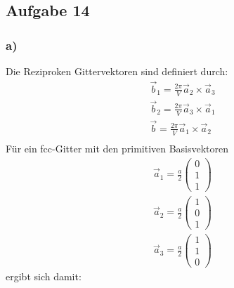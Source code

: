 \subsection*{Aufgabe 14}
\subsubsection*{a)}
Die Reziproken Gittervektoren sind definiert durch:
\begin{align*}
\vec{b}_1 = \frac{2\pi}{V} \vec{a}_2\times\vec{a}_3\\
\vec{b}_2 = \frac{2\pi}{V} \vec{a}_3\times\vec{a}_1\\
\vec{b} = \frac{2\pi}{V} \vec{a}_1\times\vec{a}_2\\
\end{align*}
Für ein fcc-Gitter mit den primitiven Basisvektoren 
\begin{align*}
\vec{a}_1=\frac{a}{2}\begin{pmatrix}0\\1\\1\end{pmatrix}\\
\vec{a}_2=\frac{a}{2}\begin{pmatrix}1\\0\\1\end{pmatrix}\\
\vec{a}_3=\frac{a}{2}\begin{pmatrix}1\\1\\0\end{pmatrix}
\end{align*}
ergibt sich damit:
